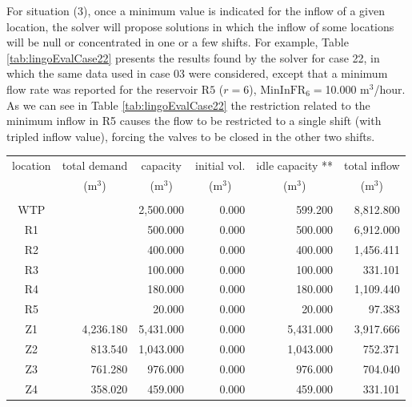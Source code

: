 \documentclass{singlecol}
\theoremstyle{TH}{
\newtheorem{lemma}{Lemma}
\newtheorem{theorem}[lemma]{Theorem}
\newtheorem{corrolary}[lemma]{Corrolary}
\newtheorem{conjecture}[lemma]{Conjecture}
\newtheorem{proposition}[lemma]{Proposition}
\newtheorem{claim}[lemma]{Claim}
\newtheorem{stheorem}[lemma]{Wrong Theorem}
\newtheorem{algorithm}{Algorithm}
}
\theoremstyle{THrm}{
\newtheorem{definition}{Definition}[section]
\newtheorem{question}{Question}[section]
\newtheorem{remark}{Remark}
\newtheorem{scheme}{Scheme}
}
\theoremstyle{THhit}{
\newtheorem{case}{Case}[section]
}
\begin{document}
For situation (3), once a minimum value is indicated for the inflow of a given location, the solver will propose solutions in which the inflow of some locations will be null or concentrated in one or a few shifts. For example, Table \ref{tab:lingoEvalCase22} presents the results found by the solver for case 22, in which the same data used in case 03 were considered, except that a minimum flow rate was reported for the reservoir $\mathrm{R5}$ ($r=6$), $\mathrm{MinInFR}_6 = $10.000 $\mathrm{m^3}$/hour. As we can see in Table \ref{tab:lingoEvalCase22} the restriction related to the minimum inflow in R5 causes the flow to be restricted to a single shift (with tripled inflow value), forcing the valves to be closed in the other two shifts.

\begin{table}[h!]
\begin{center}
\begin{small}
	\begin{tabular}{ c r r r r r } 
		location & \multicolumn{1}{c}{total demand}      & \multicolumn{1}{c}{capacity} & \multicolumn{1}{c}{initial vol.} & \multicolumn{1}{c}{idle capacity **} & \multicolumn{1}{c}{total inflow}  \\
		      & \multicolumn{1}{c}{($\mathrm{m^3}$)} & \multicolumn{1}{c}{($\mathrm{m^3}$)}   & \multicolumn{1}{c}{($\mathrm{m^3}$)}     &  \multicolumn{1}{c}{($\mathrm{m^3}$)}   &  \multicolumn{1}{c}{($\mathrm{m^3}$)}               \\
		\\
		WTP   &           & 2,500.000 & 0.000 &  599.200 & 8,812.800 \\
		R1    &           &   500.000 & 0.000 &  500.000 & 6,912.000\\
		R2    &           &   400.000 & 0.000 &  400.000 & 1,456.411 \\
		R3    &           &   100.000 & 0.000 &  100.000 &   331.101 \\
	    R4    &           &   180.000 & 0.000 &  180.000 & 1,109.440  \\
	    R5    &           &    20.000 & 0.000 &   20.000 &    97.383 \\
	    Z1    & 4,236.180 & 5,431.000 & 0.000 &  5,431.000 & 3,917.666 \\
	    Z2    &   813.540 & 1,043.000 & 0.000 &  1,043.000 &   752.371 \\
	    Z3    &   761.280 &   976.000 & 0.000 &    976.000 &   704.040 \\
	    Z4    &   358.020 &   459.000 & 0.000 &    459.000 &   331.101 \\

\end{tabular}
\end{small}
\end{center}
\end{table}
\end{document}
